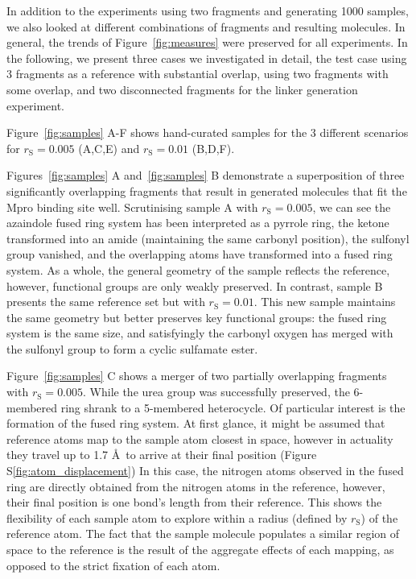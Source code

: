 \documentclass[journal=jacsat,manuscript=article]{achemso}
\begin{document}
In addition to the experiments using two fragments and generating 1000 samples, we also looked at different combinations of fragments and resulting molecules. In general, the trends of Figure~\ref{fig:measures} were preserved for all experiments. In the following, we present three cases we investigated in detail, the test case using 3 fragments as a reference with substantial overlap, using two fragments with some overlap, and two disconnected fragments for the linker generation experiment. 

Figure~\ref{fig:samples} A-F shows hand-curated samples for the 3 different scenarios for $r_{\mathrm{S}}=0.005$ (A,C,E) and $r_{\mathrm{S}}=0.01$ (B,D,F).

Figures~\ref{fig:samples} A and~\ref{fig:samples} B demonstrate a superposition of three significantly overlapping fragments that result in generated molecules that fit the Mpro binding site well. Scrutinising sample A with $r_{\mathrm{S}}=0.005$, we can see the azaindole fused ring system has been interpreted as a pyrrole ring, the ketone transformed into an amide (maintaining the same carbonyl position), the sulfonyl group vanished, and the overlapping atoms have transformed into a fused ring system. As a whole, the general geometry of the sample reflects the reference, however, functional groups are only weakly preserved. In contrast, sample B presents the same reference set but with $r_{\mathrm{S}}=0.01$. This new sample maintains the same geometry but better preserves key functional groups: the fused ring system is the same size, and satisfyingly the carbonyl oxygen has merged with the sulfonyl group to form a cyclic sulfamate ester.


Figure~\ref{fig:samples} C shows a merger of two partially overlapping fragments with $r_{\mathrm{S}}=0.005$. While the urea group was successfully preserved, the 6-membered ring shrank to a 5-membered heterocycle. Of particular interest is the formation of the fused ring system. At first glance, it might be assumed that reference atoms map to the sample atom closest in space, however in actuality they travel up to 1.7 \AA~to arrive at their final position (Figure S\ref{fig:atom_displacement}) In this case, the nitrogen atoms observed in the fused ring are directly obtained from the nitrogen atoms in the reference, however, their final position is one bond’s length from their reference. This shows the flexibility of each sample atom to explore within a radius (defined by $r_{\mathrm{S}}$) of the reference atom. The fact that the sample molecule populates a similar region of space to the reference is the result of the aggregate effects of each mapping, as opposed to the strict fixation of each atom. 
\end{document}
